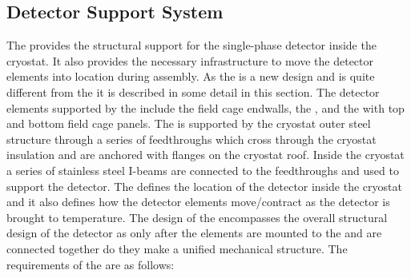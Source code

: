 \subsection{Detector Support System}

The  provides the structural support for the single-phase
detector inside the cryostat.  It also provides the necessary
infrastructure to move the detector elements into location during
assembly. As the  is a new design and is quite different
from the   it is described in some detail in this
section. The detector elements supported by the  include
the field cage endwalls, the , and the  with
top and bottom field cage panels.  The  is supported by the
cryostat outer steel structure through a series of feedthroughs which
cross through the cryostat insulation and are anchored with flanges on
the cryostat roof. Inside the cryostat a series of stainless steel
I-beams are connected to the feedthroughs and used to support the
detector. The  defines the location of the detector inside
the cryostat and it also defines how the detector elements
move/contract as the detector is brought to 
temperature. The design of the  encompasses the overall
structural design of the detector as only after the elements are
mounted to the  and are connected together do they make a
unified mechanical structure. The requirements of the  are
as follows:
